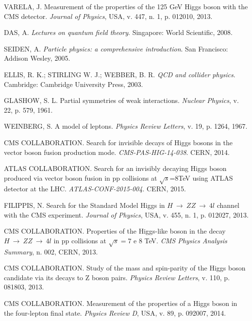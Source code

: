 \begin{thebibliography}{}
VARELA, J. Measurement of the properties of the 125 GeV Higgs boson with the CMS detector. \textit{Journal of Physics}, USA, v. 447, n. 1, p. 012010, 2013.

DAS, A. \textit{Lectures on quantum field theory}. Singapore: World Scientific, 2008.

SEIDEN, A. \textit{Particle physics: a comprehensive introduction}. San Francisco: Addison Wesley, 2005.

ELLIS, R. K.; STIRLING W. J.; WEBBER, B. R. \textit{QCD and collider physics}. Cambridge: Cambridge University Press, 2003.

GLASHOW, S. L. Partial symmetries of weak interactions. \textit{Nuclear Physics}, v. 22, p. 579, 1961.

WEINBERG, S. A model of leptons. \textit{Physics Review Letters}, v. 19, p. 1264, 1967.

CMS COLLABORATION. Search for invisible decays of Higgs bosons in the vector boson fusion production mode. \textit{CMS-PAS-HIG-14-038}. CERN, 2014.

ATLAS COLLABORATION. Search for an invisibly decaying Higgs boson produced via vector boson fusion in pp collisions at $\sqrt{s}$=8TeV using ATLAS detector at the LHC. \textit{ATLAS-CONF-2015-004}. CERN, 2015.

FILIPPIS, N. Search for the Standard Model Higgs in $H~\rightarrow~ZZ~\rightarrow~4l$ channel with the CMS experiment. \textit{Journal of Physics}, USA, v. 455, n. 1, p. 012027, 2013.

CMS COLLABORATION. Properties of the Higgs-like boson in the decay $H~\rightarrow~ZZ~\rightarrow~4l$ in pp collisions at $\sqrt{s}=7$ e 8 TeV. \textit{CMS Physics Analysis Summary}, n. 002, CERN, 2013.

CMS COLLABORATION. Study of the mass and spin-parity of the Higgs boson candidate via its decays to Z boson pairs. \textit{Physics Review Letters}, v. 110,	p. 081803, 2013.

CMS COLLABORATION. Measurement of the properties of a Higgs boson in the four-lepton	final state. \textit{Physics Review D}, USA, v. 89, p. 092007, 2014.


\end{thebibliography}
